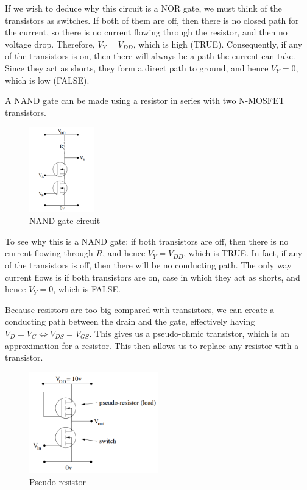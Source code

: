 \documentclass{article}
\begin{document}
If we wish to deduce why this circuit is a NOR gate, we must think of the transistors as switches. If both of them are off, then there is no closed path for the current, so there is no current flowing through the resistor, and then no voltage drop. Therefore, $V_Y = V_{DD}$, which is high (TRUE). Consequently, if any of the transistors is on, then there will always be a path the current can take. Since they act as shorts, they form a direct path to ground, and hence $V_Y = 0$, which is low (FALSE).

\begin{proposition}
    A NAND gate can be made using a resistor in series with two N-MOSFET transistors.
\end{proposition}

\begin{figure}[h]
    \centering
    \includegraphics[width = 0.25\textwidth]{images/Screenshot 2024-04-06 113538.png}
    \caption{NAND gate circuit}
    \label{fig:enter-label}
\end{figure}

To see why this is a NAND gate: if both transistors are off, then there is no current flowing through $R$, and hence $V_Y = V_{DD}$, which is TRUE. In fact, if any of the transistors is off, then there will be no conducting path. The only way current flows is if both transistors are on, case in which they act as shorts, and hence $V_Y = 0$, which is FALSE.

\begin{proposition}
    Because resistors are too big compared with transistors, we can create a conducting path between the drain and the gate, effectively having $V_D = V_G \iff V_{DS} = V_{GS}$. This gives us a pseudo-ohmic transistor, which is an approximation for a resistor. This then allows us to replace any resistor with a transistor.
\end{proposition}

\begin{figure}[h]
    \centering
    \includegraphics[width = 0.5\textwidth]{images/Screenshot 2024-04-06 114013.png}
    \caption{Pseudo-resistor}
    \label{fig:enter-label}
\end{figure}
\end{document}
